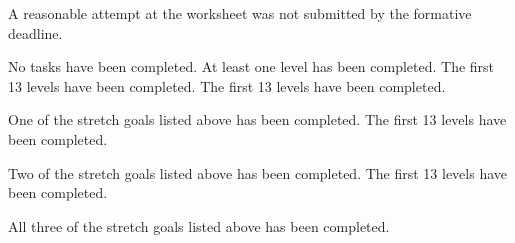 \documentclass{../../../fal_assignment}
\begin{document}
\begin{markingrubric}
		\grade\fail	A reasonable attempt at the worksheet was not submitted by the formative deadline.
		
        \grade\fail No tasks have been completed.
        \grade At least one level has been completed.
        \grade The first 13 levels have been completed.
        \grade The first 13 levels have been completed.
            \par One of the stretch goals listed above has been completed.
        \grade The first 13 levels have been completed.
            \par Two of the stretch goals listed above has been completed.
        \grade The first 13 levels have been completed.
            \par All three of the stretch goals listed above has been completed.
\end{markingrubric}
\end{document}

